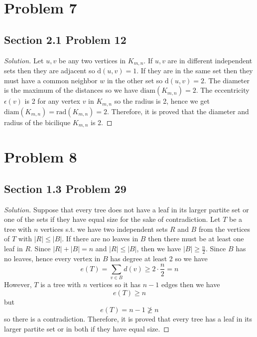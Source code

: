 \documentclass[12pt]{article}
\newenvironment*{solution}{\begin{proof}[Solution]}{\end{proof}}
\begin{document}
\section*{Problem 7}
\subsection*{Section 2.1 Problem 12}
\begin{solution}
    Let \(u,v\) be any two vertices in \(K_{m,n}\). If \(u,v\) are in
    different independent sets then they are adjacent so \(\text{d}(u,v)=1\).
    If they are in the same set then they must have a common neighbor \(w\) in
    the other set so \(\text{d}(u,v)=2\). The diameter is the maximum of the
    distances so we have \(\text{diam}(K_{m,n})=2\). The eccentricity \(
    \epsilon(v)\) is 2 for any vertex \(v\) in \(K_{m,n}\) so the radius is 2,
    hence we get \(\text{diam}(K_{m,n})=\text{rad}(K_{m,n})=2\). Therefore, it
    is proved that the diameter and radius of the bicilique \(K_{m,n}\) is 2.
\end{solution}
\section*{Problem 8}
\subsection*{Section 1.3 Problem 29}
\begin{solution}
    Suppose that every tree does not have a leaf in its larger partite set or
    one of the sets if they have equal size for the sake of contradiction. Let
    \(T\) be a tree with \(n\) vertices s.t. we have two independent sets \(R
    \) and \(B\) from the vertices of \(T\) with \(|R|\leq|B|\). If there are
    no leaves in \(B\) then there must be at least one leaf in \(R\). Since \(
    |R|+|B|=n\) and \(|R|\leq|B|\), then we have \(|B|\geq\frac{n}{2}\). Since
    \(B\) has no leaves, hence every vertex in \(B\) has degree at least 2 so
    we have \[e(T)=\sum_{v\in B}d(v)\geq2\cdot\frac{n}{2}=n\]However, \(T\) is
    a tree with \(n\) vertices so it has \(n-1\) edges then we have \[e(T)\geq
    n\] but \[e(T)=n-1\not\geq n\] so there is a contradiction. Therefore, it
    is proved that every tree has a leaf in its larger partite set or in both
    if they have equal size.
\end{solution}
\end{document}
